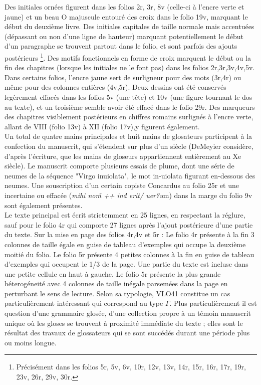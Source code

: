 \documentclass[a4paper, twoside, 12pt]{book}
\begin{document}
Des initiales ornées figurent dans les folios 2r, 3r, 8v (celle-ci à l'encre verte et jaune) et un beau \og{} O \fg{} majuscule entouré des croix dans le folio 19v, marquant le début du deuxième livre. Des initiales capitales de taille normale mais accentuées (dépassant ou non d'une ligne de hauteur) marquant potentiellement le début d'un paragraphe se trouvent partout dans le folio, et sont parfois des ajouts postérieurs \footnote{ Précisément dans les folios 5r, 5v, 6v, 10r, 12v, 13v, 14r, 15r, 16r, 17r, 19r, 23v, 26r, 29v, 30r.}. Des motifs fonctionnels en forme de croix marquent le début ou la fin des chapitres (lorsque les initiales ne le font pas) dans les folios 2r,3r,3v,4v,5v. Dans certains folios, l'encre jaune sert de surligneur pour des mots (3r,4r) ou même pour des colonnes entières (4v,5r). Deux dessins ont été conservés legèrement effacés dans les folios 5v (une tête) et 10v (une figure tournant le dos au texte), et un troisième semble avoir été effacé dans le folio 29r. Des marqueurs des chapitres visiblement postérieurs en chiffres romains surlignés à l'encre verte, allant de VIII (folio 13v) à XII (folio 17v),y figurent également.\\

Un total de quatre mains principales et huit mains de glosateurs participent à la confection du manuscrit, qui s'étendent sur plus d'un siècle (DeMeyier considère, d'après l'écriture, que les mains de gloseurs appartiennent entièrement au Xe siècle). Le manuscrit comporte plusieurs essais de plume, dont une série de neumes de la séquence "Virgo inuiolata", le mot in-uiolata figurant en-dessous des neumes. Une souscription d'un certain copiste Concardus au folio 25r et une incertaine ou effacée (\textit{mihi nom̃ ++ inđ erit/ uer?u}m) dans la marge du folio 9v sont également présentes. \\

Le texte principal est écrit strictemment en 25 lignes, en respectant la réglure, sauf pour le folio 4r qui comporte 27  lignes après l'ajout postérieure d'une partie du texte. Sur la mise en page des folios 4r,4v et 5r : Le folio 4r présente à la fin 3 colonnes de taille égale en guise de tableau d'exemples qui  occupe la deuxième moitié du folio. Le folio 5r présente 4 petites colonnes à la fin en guise de tableau d'exemples qui occupent  le 1/3 de la page. Une partie du texte est incluse dans une petite cellule en haut à gauche. Le folio 5r présente la  plus grande héterogéneité avec 4 colonnes de taille inégale parsemées dans la page en perturbant le sens de lecture. Selon sa typologie, VLO41 constitue un cas particulièrement intéressant qui correspond au type $\Gamma$. Plus particulièrement il est question d'une grammaire glosée, d'une collection propre à un témoin manuscrit unique où les gloses se trouvent à proximité immédiate du texte ; elles sont le résultat des travaux de glossateurs qui se sont succédés durant une période plus ou moins longue. \\
\end{document}

